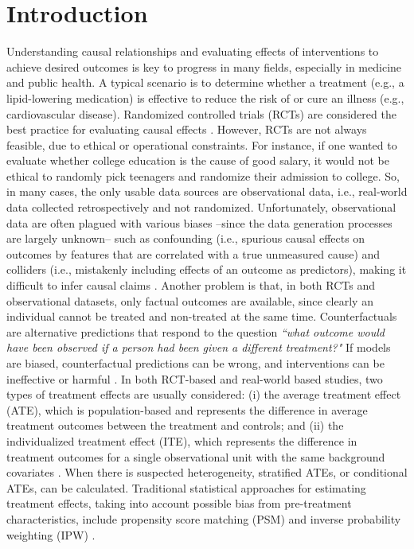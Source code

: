 \documentclass{amia}
\begin{document}
\section*{Introduction}
Understanding causal relationships and evaluating effects of interventions to achieve desired outcomes is key to progress in many fields, especially in medicine and public health. A typical scenario is to determine whether a treatment (e.g., a lipid-lowering medication) is effective to reduce the risk of or cure an illness (e.g., cardiovascular disease). Randomized controlled trials (RCTs) are considered the best practice for evaluating causal effects \cite{Sibbald201}. However, RCTs are not always feasible, due to ethical or operational constraints. For instance, if one wanted to evaluate whether college education is the cause of good salary, it would not be ethical to randomly pick teenagers and randomize their admission to college. So, in many cases, the only usable data sources are observational data, i.e., real-world data collected retrospectively and not randomized. Unfortunately, observational data are often plagued with various biases --since the data generation processes are largely unknown-- such as confounding (i.e., spurious causal effects on outcomes by features that are correlated with a true unmeasured cause) and colliders (i.e., mistakenly including effects of an outcome as predictors), making it difficult to infer causal claims \cite{hernan2019causal}. Another problem is that, in both RCTs and observational datasets, only factual outcomes are available, since clearly an individual cannot be treated and non-treated at the same time. Counterfactuals are alternative predictions that respond to the question \emph{``what outcome would have been observed if a person had been given a different treatment?"}  If models are biased, counterfactual predictions can be wrong, and interventions can be ineffective or harmful \cite{prosperi2020}. In both RCT-based and real-world based studies, two types of treatment effects are usually considered: (i) the average treatment effect (ATE), which is  population-based and represents the difference in average treatment outcomes between the treatment and controls; and (ii) the individualized treatment effect (ITE), which represents the difference in treatment outcomes for a single observational unit with the same background covariates \cite{hoogland21}. When there is suspected heterogeneity, stratified ATEs, or conditional ATEs, can be calculated.
Traditional statistical approaches for estimating treatment effects, taking into account possible bias from pre-treatment characteristics, include propensity score matching (PSM) and inverse probability weighting (IPW) \cite{austin2011introduction}.
\end{document}
